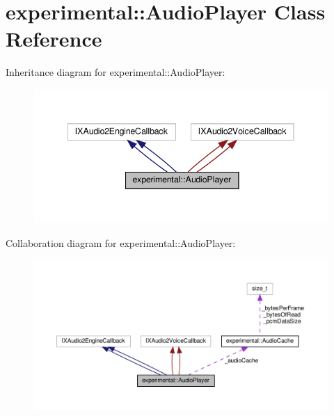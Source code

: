 \hypertarget{classexperimental_1_1AudioPlayer}{}\section{experimental\+:\+:Audio\+Player Class Reference}
\label{classexperimental_1_1AudioPlayer}


Inheritance diagram for experimental\+:\+:Audio\+Player\+:
\nopagebreak
\begin{figure}[H]
\begin{center}
\leavevmode
\includegraphics[width=342pt]{classexperimental_1_1AudioPlayer__inherit__graph}
\end{center}
\end{figure}


Collaboration diagram for experimental\+:\+:Audio\+Player\+:
\nopagebreak
\begin{figure}[H]
\begin{center}
\leavevmode
\includegraphics[width=350pt]{classexperimental_1_1AudioPlayer__coll__graph}
\end{center}
\end{figure}
